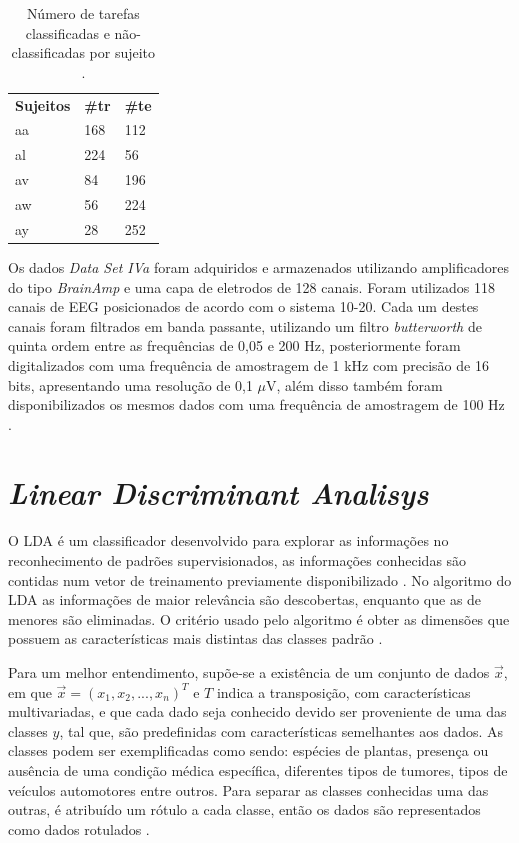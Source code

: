 \begin{table}[]
	\centering
	\caption{Número de tarefas classificadas e não-classificadas por sujeito \cite{BCICompetition}.}
	\label{tarefas}
	\begin{tabular}{lll}
		\rowcolor[HTML]{ECF4FF} 
		\textbf{Sujeitos} & \textbf{\#tr} & \textbf{\#te} \\
		aa                & 168           & 112           \\
		\rowcolor[HTML]{ECF4FF} 
		al                & 224           & 56            \\
		av                & 84            & 196           \\
		\rowcolor[HTML]{ECF4FF} 
		aw                & 56            & 224           \\
		ay                & 28            & 252          
	\end{tabular}
\end{table}
Os dados \textit{Data Set IVa} foram adquiridos e armazenados utilizando amplificadores do tipo \textit{BrainAmp} e uma capa de eletrodos de 128 canais. Foram utilizados 118 canais de EEG posicionados de acordo com o sistema 10-20. Cada um destes canais foram filtrados em banda passante, utilizando um filtro \textit{butterworth} de quinta ordem entre as frequências de 0,05 e 200 Hz, posteriormente foram digitalizados com uma frequência de amostragem de 1 kHz com precisão de 16 bits, apresentando uma resolução de 0,1 $\mu$V, além disso também foram disponibilizados os mesmos dados com uma frequência de amostragem de 100 Hz \cite{siteBCI}.
 
\section{\textit{Linear Discriminant Analisys}}
O LDA é um classificador desenvolvido para explorar as informações no reconhecimento de padrões supervisionados,
as informações conhecidas são contidas num vetor de treinamento previamente disponibilizado \cite{izenmanLDA}.
No algoritmo do LDA as informações de maior relevância são descobertas, enquanto que as de menores são 
eliminadas. O critério usado pelo algoritmo é obter as dimensões que possuem as características mais
distintas das classes padrão \cite{korkmaz2017expert}.

Para um melhor entendimento, supõe-se a existência de um conjunto de dados $\vec x$, em que $\vec x = (x_1, x_2,...,x_n)^T$
e $T$ indica a transposição, com características multivariadas, e que cada dado
seja conhecido devido ser proveniente de uma das  classes $y$, tal que, são predefinidas com características
semelhantes aos dados. As classes podem ser exemplificadas como sendo: espécies de plantas,
presença ou ausência de uma condição médica específica, diferentes tipos de tumores, tipos de veículos automotores
entre outros. Para separar as classes conhecidas uma das outras, é atribuído um rótulo a cada classe, então os dados são
representados como dados rotulados \cite{izenmanLDA}.


